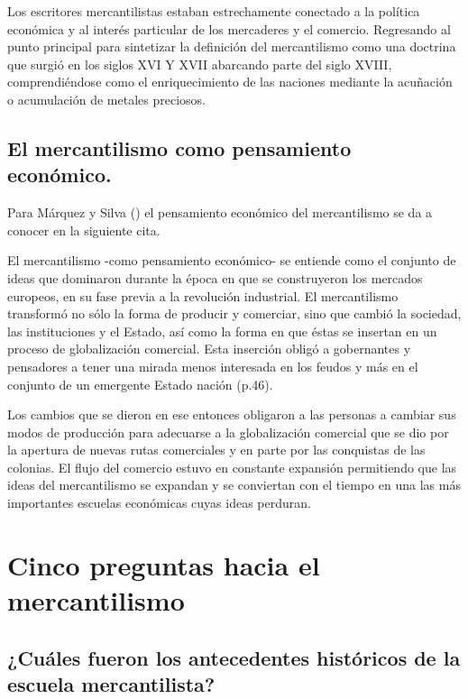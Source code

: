 \documentclass[
  jou,
  floatsintext,
  longtable,
  a4paper,
  nolmodern,
  notxfonts,
  notimes,
  colorlinks=true,linkcolor=blue,citecolor=blue,urlcolor=blue]{apa7}
\begin{document}
Los escritores mercantilistas estaban estrechamente conectado a la
política económica y al interés particular de los mercaderes y el
comercio. Regresando al punto principal para sintetizar la definición
del mercantilismo como una doctrina que surgió en los siglos XVI Y XVII
abarcando parte del siglo XVIII, comprendiéndose como el enriquecimiento
de las naciones mediante la acuñación o acumulación de metales
preciosos.

\subsection{El mercantilismo como pensamiento
económico.}\label{el-mercantilismo-como-pensamiento-econuxf3mico.}

Para Márquez y Silva
() el pensamiento
económico del mercantilismo se da a conocer en la siguiente cita.

El mercantilismo -como pensamiento económico- se entiende como el
conjunto de ideas que dominaron durante la época en que se construyeron
los mercados europeos, en su fase previa a la revolución industrial. El
mercantilismo transformó no sólo la forma de producir y comerciar, sino
que cambió la sociedad, las instituciones y el Estado, así como la forma
en que éstas se insertan en un proceso de globalización comercial. Esta
inserción obligó a gobernantes y pensadores a tener una mirada menos
interesada en los feudos y más en el conjunto de un emergente Estado
nación (p.46).

Los cambios que se dieron en ese entonces obligaron a las personas a
cambiar sus modos de producción para adecuarse a la globalización
comercial que se dio por la apertura de nuevas rutas comerciales y en
parte por las conquistas de las colonias. El flujo del comercio estuvo
en constante expansión permitiendo que las ideas del mercantilismo se
expandan y se conviertan con el tiempo en una las más importantes
escuelas económicas cuyas ideas perduran.

\section{Cinco preguntas hacia el
mercantilismo}\label{cinco-preguntas-hacia-el-mercantilismo}

\subsection{¿Cuáles fueron los antecedentes históricos de la escuela
mercantilista?}\label{cuuxe1les-fueron-los-antecedentes-histuxf3ricos-de-la-escuela-mercantilista}
\end{document}
